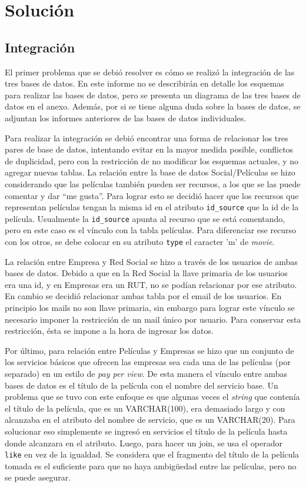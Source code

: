 \documentclass[12pt,letterpaper]{article}
\begin{document}
\section{Solución}

\subsection{Integración}

El primer problema que se debió resolver es cómo se realizó la integración de las tres bases de datos. En este informe no se describirán en detalle los esquemas para realizar las bases de datos, pero se presenta un diagrama de las tres bases de datos en el anexo.
Además, por si se tiene alguna duda sobre la bases de datos, se adjuntan los informes anteriores de las bases de datos individuales.

Para realizar la integración se debió encontrar una forma de relacionar los tres pares de base de datos, intentando evitar en la mayor medida posible, conflictos de duplicidad, pero con la restricción de no modificar los esquemas actuales, y no agregar nuevas tablas. La relación entre la base de datos Social/Películas se hizo considerando que las películas también pueden ser recursos, a los que se las puede comentar y dar ``me gusta''. Para lograr esto se decidió hacer que los recursos que representan películas tengan la misma id en el atributo \texttt{id\_source} que la id de la película. Usualmente la \texttt{id\_source} apunta al recurso que se está comentando, pero en este caso es el vínculo con la tabla películas. Para diferenciar ese recurso con los otros, se debe colocar en su atributo \texttt{type} el caracter 'm' de \emph{movie}.

La relación entre Empresa y Red Social se hizo a través de los usuarios de ambas bases de datos. Debido a que en la Red Social la llave primaria de los usuarios era una id, y en Empresas era un RUT, no se podían relacionar por ese atributo. En cambio se decidió relacionar ambas tabla por el email de los usuarios. En principio los mails no son llave primaria, sin embargo para lograr este vínculo se necesario imponer la restricción de un mail único por usuario. Para conservar esta restricción, ésta se impone a la hora de ingresar los datos.

Por último, para relación entre Películas y Empresas se hizo que un conjunto de los servicios básicos que ofrecen las empresas sea cada una de las películas (por separado) en un estilo de \emph{pay per view}. De esta manera el vínculo entre ambas bases de datos es el título de la película con el nombre del servicio base. Un problema que se tuvo con este enfoque es que algunas veces el \emph{string} que contenía el título de la película, que es un VARCHAR(100), era demasiado largo y con alcanzaba en el atributo del nombre de servicio, que es un VARCHAR(20). Para solucionar eso simplemente se ingresó en servicios el título de la película hasta donde alcanzara en el atributo. Luego, para hacer un join, se usa el operador \texttt{like} en vez de la igualdad. Se considera que el fragmento del título de la película tomada es el suficiente para que no haya ambigüedad entre las películas, pero no se puede asegurar.
\end{document}
